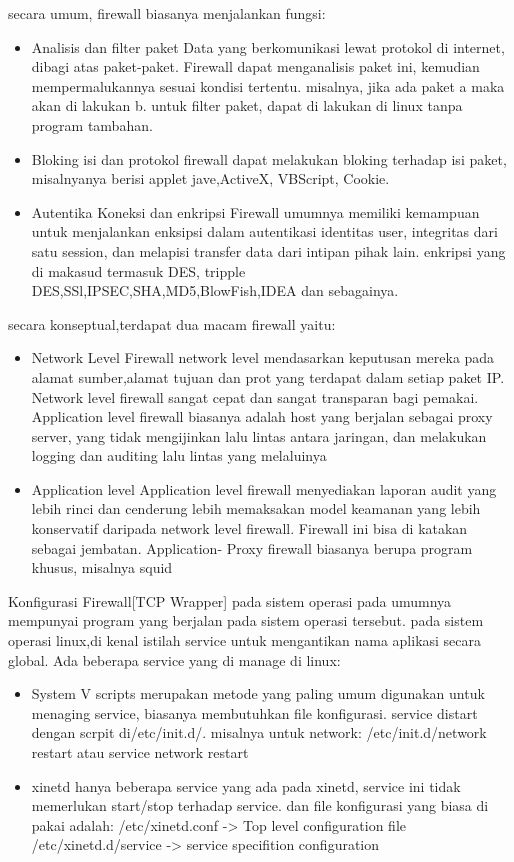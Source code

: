 secara umum, firewall biasanya menjalankan fungsi:
\begin{itemize}
  \item Analisis dan filter paket
        Data yang berkomunikasi lewat protokol di internet, dibagi atas paket-paket. Firewall dapat menganalisis paket ini, kemudian mempermalukannya sesuai kondisi tertentu. misalnya, jika ada paket a maka akan di lakukan b. untuk filter paket, dapat di lakukan di linux tanpa program tambahan.
  \item Bloking isi dan protokol
        firewall dapat melakukan bloking terhadap isi paket, misalnyanya berisi applet jave,ActiveX, VBScript, Cookie.
  \item Autentika Koneksi dan enkripsi
        Firewall umumnya memiliki kemampuan untuk menjalankan enksipsi dalam autentikasi identitas user, integritas dari satu session, dan melapisi transfer data dari intipan pihak lain. enkripsi yang di makasud termasuk DES, tripple DES,SSl,IPSEC,SHA,MD5,BlowFish,IDEA dan sebagainya.
\end{itemize}

secara konseptual,terdapat dua macam firewall yaitu:
\begin{itemize}
  \item Network Level
        Firewall network level mendasarkan keputusan mereka pada alamat sumber,alamat tujuan dan prot yang terdapat dalam setiap paket IP. Network level firewall sangat cepat dan sangat transparan bagi pemakai. Application level firewall biasanya adalah host yang berjalan sebagai proxy server, yang tidak mengijinkan lalu lintas antara jaringan, dan melakukan logging dan auditing lalu lintas yang melaluinya
  \item Application level
        Application level firewall menyediakan laporan audit yang lebih rinci dan cenderung lebih memaksakan model keamanan yang lebih konservatif daripada network level firewall. Firewall ini bisa di katakan sebagai jembatan. Application- Proxy firewall biasanya berupa program khusus, misalnya squid
\end{itemize}

Konfigurasi Firewall[TCP Wrapper]
pada sistem operasi pada umumnya mempunyai program yang berjalan pada sistem operasi tersebut. pada sistem operasi linux,di kenal istilah service untuk mengantikan nama aplikasi secara global. Ada beberapa service yang di manage di linux:
\begin{itemize}
  \item System V scripts
        merupakan metode yang paling umum digunakan untuk menaging service, biasanya membutuhkan file konfigurasi. service distart dengan scrpit di/etc/init.d/. misalnya untuk network: /etc/init.d/network restart atau service network restart
  \item xinetd
        hanya beberapa service yang ada pada xinetd, service ini tidak memerlukan start/stop terhadap service. dan file konfigurasi yang biasa di pakai adalah:
        /etc/xinetd.conf -> Top level configuration file
        /etc/xinetd.d/service -> service specifition configuration
\end{itemize}

